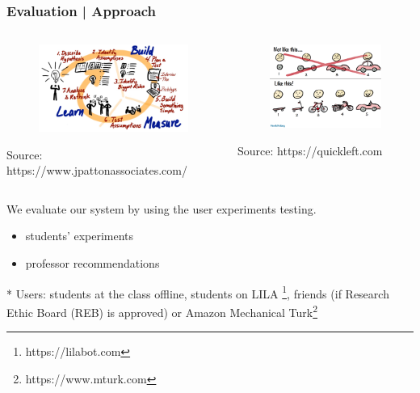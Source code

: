 \documentclass{beamer}
\begin{document}
\begin{frame}
\frametitle{Evaluation | Approach }


\begin{columns}[onlytextwidth]
	\begin{column}{.45\textwidth}
		\begin{figure}
			\includegraphics[width=.8\textwidth]{lsm}
		\end{figure}
	\begin{center}
			{\tiny 	Source: https://www.jpattonassociates.com/}
	\end{center}
	\end{column}
	\hfill
	\begin{column}{.45\textwidth}
		\begin{figure}
			\includegraphics[width=.6\textwidth]{mvp}
		\end{figure}
	\begin{center}
			{\tiny 	Source: https://quickleft.com}
	\end{center}
	\end{column}
\end{columns}

{\scriptsize *  We evaluate our system by using the user experiments testing. 
	\begin{itemize}
		\item students' experiments
		\item professor recommendations
	\end{itemize}
*  Users: students at the class offline, students on LILA \footnote{https://lilabot.com }, friends (if Research Ethic Board (REB) is approved) or Amazon Mechanical Turk\footnote{https://www.mturk.com}}



\end{frame}
\end{document}
